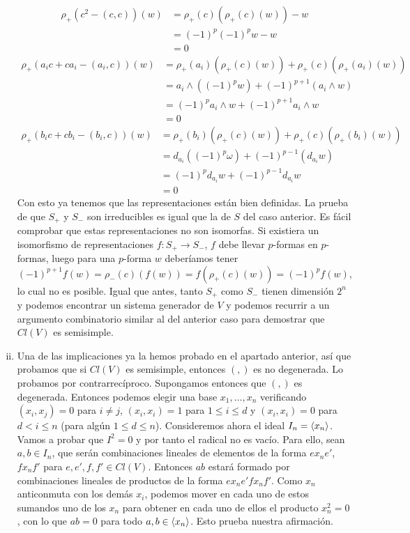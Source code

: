 \documentclass[twoside]{article}
\begin{document}
\begin{enumerate}[(i)]
\begin{align*}
\rho_+(c^2 - ( c, c))(w)
&= \rho_+(c)(\rho_+(c)(w)) - w \\
&= (-1)^p(-1)^p w - w \\
&= 0
\end{align*}
\begin{align*}
\rho_+(a_i c + c a_i - ( a_i, c ))(w)
&= \rho_+(a_i)(\rho_+(c)(w)) + \rho_+(c)(\rho_+(a_i)(w)) \\
&= a_i \wedge ((-1)^p w) + (-1)^{p+1}(a_i \wedge w) \\
&= (-1)^p a_i \wedge w + (-1)^{p+1}a_i \wedge w \\
&= 0
\end{align*}
\begin{align*}
\rho_+(b_i c + c b_i - ( b_i, c ))(w)
&= \rho_+(b_i)(\rho_+(c)(w)) + \rho_+(c)(\rho_+(b_i)(w)) \\
&= d_{a_i}((-1)^p \omega) + (-1)^{p-1}(d_{a_i}w) \\
&= (-1)^pd_{a_i}w + (-1)^{p-1}d_{a_i}w \\
&= 0
\end{align*}
Con esto ya tenemos que las representaciones están bien definidas. La prueba de que $S_+$ y $S_-$ son irreducibles es igual que la de $S$ del caso anterior. Es fácil comprobar que estas representaciones no son isomorfas. Si existiera un isomorfismo de representaciones $f:S_+\to S_-$, $f$ debe llevar $p$-formas en $p$-formas, luego para una $p$-forma $w$ deberíamos tener $(-1)^{p+1}f(w)=\rho_-(c)(f(w))=f(\rho_+(c)(w))=(-1)^pf(w)$, lo cual no es posible. Igual que antes, tanto $S_+$ como $S_-$ tienen dimensión $2^n$ y podemos encontrar un sistema generador de $V$ y podemos recurrir a un argumento combinatorio similar al del anterior caso para demostrar que $Cl(V)$ es semisimple. 

\item Una de las implicaciones ya la hemos probado en el apartado anterior, así que probamos que si $Cl(V)$ es semisimple, entonces $(,)$ es no degenerada. Lo probamos por contrarrecíproco. Supongamos entonces que $(,)$ es degenerada. Entonces podemos elegir una base $x_1,\dots, x_n$ verificando $(x_i,x_j)=0$ para $i\neq j$, $(x_i,x_i)=1$ para $1\leq i\leq d$ y $(x_i,x_i)=0$ para $d<i\leq n$ (para algún $1\leq d\leq n$). Consideremos ahora el ideal $I_n=\langle{x_n}\rangle$. Vamos a probar que $I^2=0$ y por tanto el radical no es vacío. Para ello, sean $a,b\in I_n$, que serán combinaciones lineales de elementos de la forma $ex_ne'$, $fx_nf'$ para $e,e',f,f'\in Cl(V)$. Entonces $ab$ estará formado por combinaciones lineales de productos de la forma $ex_ne'fx_nf'$. Como $x_n$ anticonmuta con los demás $x_i$, podemos mover en cada uno de estos sumandos uno de los $x_n$ para obtener en cada uno de ellos el producto $x_n^2=0$, con lo que $ab=0$ para todo $a,b\in \langle{x_n}\rangle$. Esto prueba nuestra afirmación. 


\end{enumerate}
\end{document}
